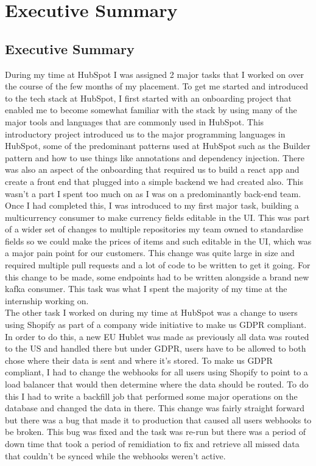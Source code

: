 \chapter{Executive Summary}

\section{Executive Summary}

During my time at HubSpot I was assigned 2 major tasks that I worked on over the course of the few months of my placement. To get me started and introduced to the tech stack at HubSpot, I first started with an onboarding project that enabled me to become somewhat familiar with the stack by using many of the major tools and languages that are commonly used in HubSpot. This introductory project introduced us to the major programming languages in HubSpot, some of the predominant patterns used at HubSpot such as the Builder pattern and how to use things like annotations and dependency injection. There was also an aspect of the onboarding that required us to build a react app and create a front end that plugged into a simple backend we had created also. This wasn't a part I spent too much on as I was on a predominantly back-end team.\newline \\ Once I had completed this, I was introduced to my first major task, building a multicurrency consumer to make currency fields editable in the UI. This was part of a wider set of changes to multiple repositories my team owned to standardise fields so we could make the prices of items and such editable in the UI, which was a major pain point for our customers. This change was quite large in size and required multiple pull requests and a lot of code to be written to get it going. For this change to be made, some endpoints had to be written alongside a brand new kafka consumer. This task was what I spent the majority of my time at the internship working on. \newline \\The other task I worked on during my time at HubSpot was a change to users using Shopify as part of a company wide initiative to make us GDPR compliant. In order to do this, a new EU Hublet was made as previously all data was routed to the US and handled there but under GDPR, users have to be allowed to both chose where their data is sent and where it's stored. To make us GDPR compliant, I had to change the webhooks for all users using Shopify to point to a load balancer that would then determine where the data should be routed. To do this I had to write a backfill job that performed some major operations on the database and changed the data in there. This change was fairly straight forward but there was a bug that made it to production that caused all users webhooks to be broken. This bug was fixed and the task was re-run but there was a period of down time that took a period of remidiation to fix and retrieve all missed data that couldn't be synced while the webhooks weren't active.